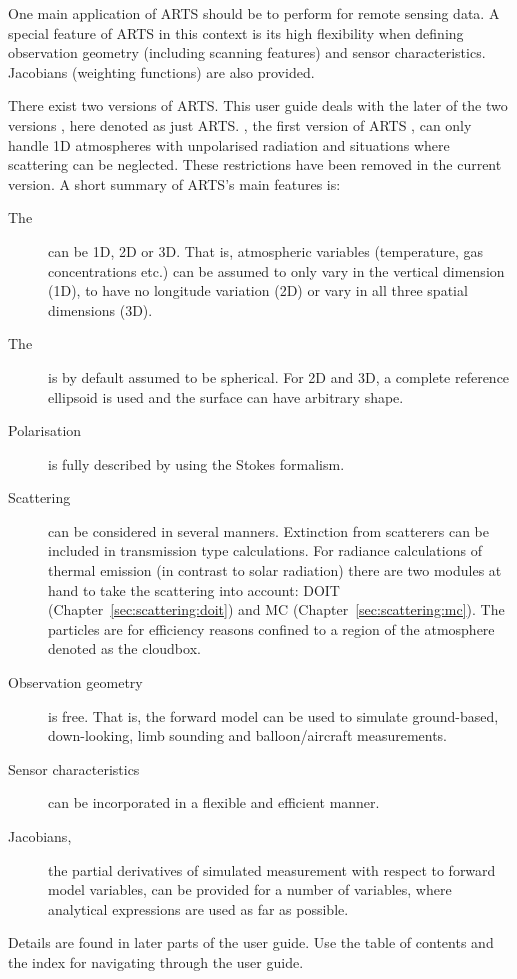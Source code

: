 One main application of ARTS should be to perform  for
remote sensing data. A special feature of ARTS in this context is its high
flexibility when defining observation geometry (including scanning features)
and sensor characteristics. Jacobians (weighting functions) are also provided.

There exist two versions of ARTS. This user guide deals with the later
of the two versions \citep{eriksson:arts2:11}, here denoted as just
ARTS. , the first version of ARTS
\citep{buehler:artst:05}, can only handle 1D atmospheres with
unpolarised radiation and situations where scattering can be
neglected.  These restrictions have been removed in the current
version. A short summary of ARTS's main features is:
\begin{description}
\item[The ] can be 1D, 2D or 3D. That is, atmospheric
  variables (temperature, gas concentrations etc.) can be assumed to
  only vary in the vertical dimension (1D), to have no longitude
  variation (2D) or vary in all three spatial dimensions (3D).
\item[The ] is by default assumed to be spherical. For 2D
  and 3D, a complete reference ellipsoid is used and the surface can have
  arbitrary shape.
\item[Polarisation] is fully described by using the Stokes formalism.
\item[Scattering] can be considered in several manners. Extinction from
  scatterers can be included in transmission type calculations.
  For radiance calculations of thermal emission (in contrast to solar radiation)
  there are two modules at hand to take the scattering into account: DOIT
  (Chapter~\ref{sec:scattering:doit}) and MC (Chapter~\ref{sec:scattering:mc}).
  The  particles are
  for efficiency reasons confined to a region of the atmosphere denoted as the
  cloudbox.
\item[Observation geometry] is free. That is, the forward model can be
  used to simulate ground-based, down-looking, limb sounding and
  balloon/aircraft measurements.
\item[Sensor characteristics] can be incorporated in a flexible and
  efficient manner.
\item[Jacobians,] the partial derivatives of simulated measurement
  with respect to forward model variables, can be provided for a
  number of variables, where analytical expressions are used as far as
  possible.
\end{description}
Details are found in later parts of the user guide. Use the table of
contents and the index for navigating through the user guide.



